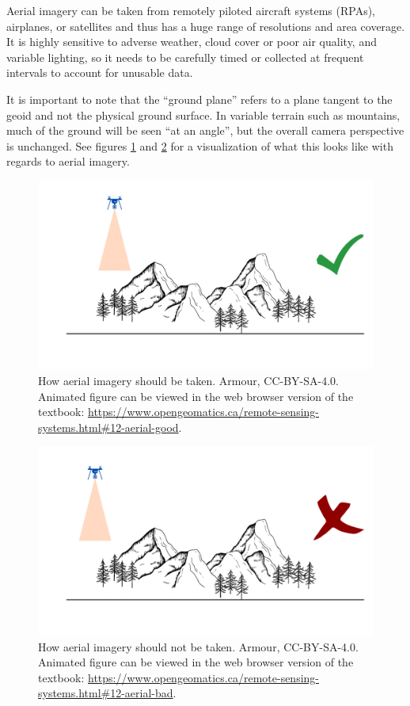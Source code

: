 \documentclass[
]{book}
\begin{document}
Aerial imagery can be taken from remotely piloted aircraft systems (RPAs), airplanes, or satellites and thus has a huge range of resolutions and area coverage. It is highly sensitive to adverse weather, cloud cover or poor air quality, and variable lighting, so it needs to be carefully timed or collected at frequent intervals to account for unusable data.

It is important to note that the ``ground plane'' refers to a plane tangent to the geoid and not the physical ground surface. In variable terrain such as mountains, much of the ground will be seen ``at an angle'', but the overall camera perspective is unchanged. See figures \ref{fig:12-aerial-good} and \ref{fig:12-aerial-bad} for a visualization of what this looks like with regards to aerial imagery.



\begin{figure}
\includegraphics[width=0.75\linewidth]{images/12-aerial-good-static} \caption{How aerial imagery should be taken. Armour, CC-BY-SA-4.0. Animated figure can be viewed in the web browser version of the textbook: \url{https://www.opengeomatics.ca/remote-sensing-systems.html\#12-aerial-good}.}\label{fig:12-aerial-good}
\end{figure}



\begin{figure}
\includegraphics[width=0.75\linewidth]{images/12-aerial-bad-static} \caption{How aerial imagery should not be taken. Armour, CC-BY-SA-4.0. Animated figure can be viewed in the web browser version of the textbook: \url{https://www.opengeomatics.ca/remote-sensing-systems.html\#12-aerial-bad}.}\label{fig:12-aerial-bad}
\end{figure}
\end{document}

